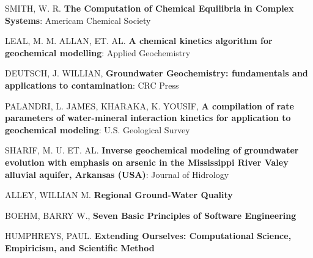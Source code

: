 \documentclass[ppgc,mestrado,english]{iiufrgs}
\begin{document}
\begin{thebibliography}{este-parametro-nao-eh-usado-pelo-estilo-ABNT}
 SMITH, W. R. 
\textbf{The Computation of Chemical Equilibria in Complex Systems}: Americam Chemical Society

 LEAL, M. M. ALLAN, ET. AL.
\textbf{A chemical kinetics algorithm for geochemical modelling}: Applied Geochemistry

 DEUTSCH, J. WILLIAN,
\textbf{Groundwater Geochemistry: fundamentals and applications to contamination}: CRC Press

 PALANDRI, L. JAMES, KHARAKA, K. YOUSIF,
\textbf{A compilation of rate parameters of water-mineral interaction kinetics for application to geochemical modeling}: U.S. Geological Survey

 SHARIF, M. U. ET. AL. 
\textbf{Inverse geochemical modeling of groundwater evolution with emphasis on arsenic in the Mississippi River Valey alluvial aquifer, Arkansas (USA)}: Journal of Hidrology

 ALLEY, WILLIAN M.
\textbf{Regional Ground-Water Quality}

 BOEHM, BARRY W.,
\textbf{Seven Basic Principles of Software Engineering}

 HUMPHREYS, PAUL.
\textbf{Extending Ourselves: Computational Science, Empiricism, and Scientific Method}

\end{thebibliography}
\end{document}
